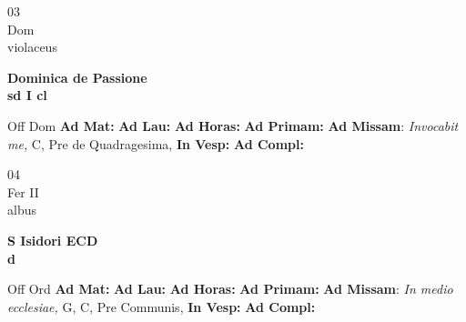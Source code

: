 \documentclass[10pt, openany]{book}
\begin{document}
    \begin{center}
        \begin{minipage}{3.5in}
            \vspace{2em}
            \begin{minipage}{0.5in}
                {\Huge 03} \\
                {\normalsize Dom} \\
                {\normalsize violaceus}
            \end{minipage}
            \begin{minipage}{3.0in}
                \textbf{ \large Dominica de Passione \\
                \textnormal{\normalsize sd I cl}} \\ 
            \end{minipage}
            \begin{justify}Off Dom
                \textbf{Ad Mat: }
                \textbf{Ad Lau: }
                \textbf{Ad Horas: }
                \textbf{Ad Primam: }\textbf{Ad Missam}: \textit{Invocabit me,} C, Pre de Quadragesima,  
                \textbf{In Vesp: }
                \textbf{Ad Compl: }
            \end{justify}
        \end{minipage}
    \end{center}

    \begin{center}
        \begin{minipage}{3.5in}
            \vspace{2em}
            \begin{minipage}{0.5in}
                {\Huge 04} \\
                {\normalsize Fer II} \\
                {\normalsize albus}
            \end{minipage}
            \begin{minipage}{3.0in}
                \textbf{ \large S Isidori ECD \\
                \textnormal{\normalsize d}} \\ 
            \end{minipage}
            \begin{justify}Off Ord
                \textbf{Ad Mat: }
                \textbf{Ad Lau: }
                \textbf{Ad Horas: }
                \textbf{Ad Primam: }\textbf{Ad Missam}: \textit{In medio ecclesiae,} G, C, Pre Communis,  
                \textbf{In Vesp: }
                \textbf{Ad Compl: }
            \end{justify}
        \end{minipage}
    \end{center}
\end{document}
